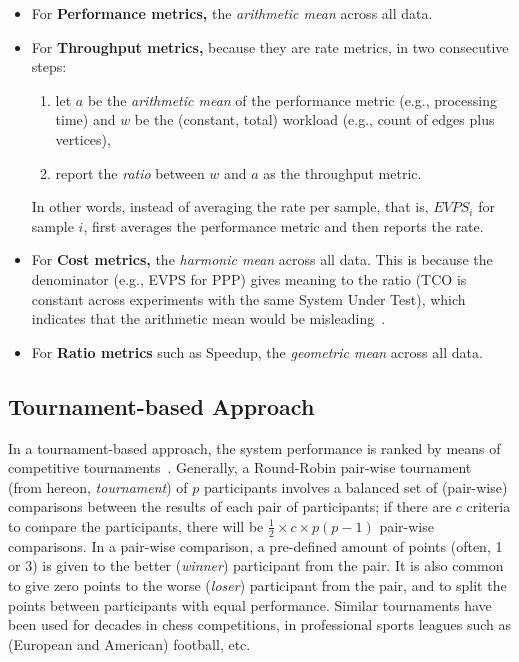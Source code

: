 \begin{itemize}
	\item For \textbf{Performance metrics,} the \emph{arithmetic mean} across all data.
	\item For \textbf{Throughput metrics,} because they are rate metrics, in two consecutive steps:
		\begin{enumerate}
			\item let $a$ be the \emph{arithmetic mean} of the performance metric (e.g., processing time) and $w$ be the (constant, total) workload (e.g., count of edges plus vertices),
			\item report the \emph{ratio} between $w$ and $a$ as the throughput metric.
		\end{enumerate}
 		In other words, instead of averaging the rate per sample, that is, $\textit{EVPS}_i$ for sample $i$, \toolname{} first averages the performance metric and then reports the rate. 
	\item For \textbf{Cost metrics,} the \emph{harmonic mean} across all data. This is because the denominator (e.g., EVPS for PPP) gives meaning to the ratio (TCO is constant across experiments with the same System Under Test), which indicates that the arithmetic mean would be misleading~\cite[S.3.1.1]{DBLP:conf/sc/HoeflerB15}.
	\item For \textbf{Ratio metrics} such as Speedup, the \emph{geometric mean} across all data.
\end{itemize}



\subsection{Tournament-based Approach} \label{sec:competitions:tournament}
In a tournament-based approach, the system performance is ranked by means of competitive tournaments~\cite{Thurstone1927}.  Generally, a Round-Robin pair-wise tournament~\cite{David1960} (from hereon, {\it tournament}) of $p$ participants involves a balanced set of (pair-wise) comparisons between the results of each pair of participants; if there are $c$ criteria to compare the participants, there will be $\frac{1}{2} \times c \times p (p - 1)$ pair-wise comparisons. In a pair-wise comparison, a pre-defined amount of points (often, 1 or 3) is given to the better ({\it winner}) participant from the pair. It is also common to give zero points to the worse ({\it loser}) participant from the pair, and to split the points between participants with equal performance. Similar tournaments have been used for decades in chess competitions, in professional sports leagues such as (European and American) football, etc.

